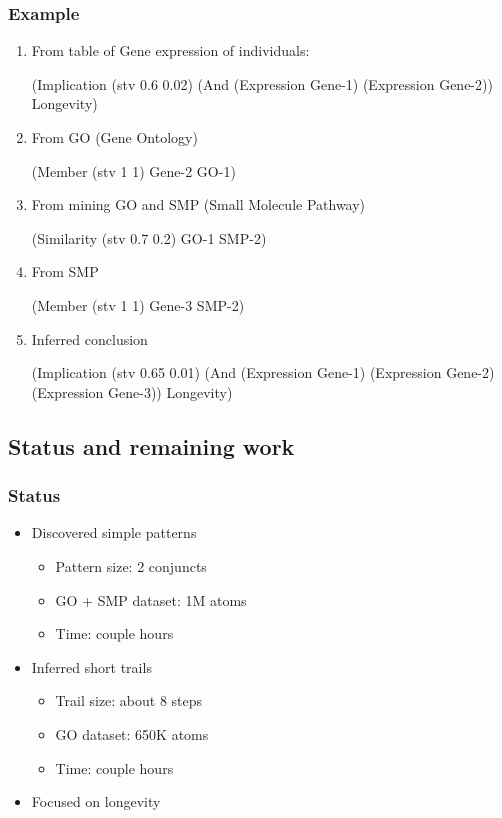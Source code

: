 \documentclass[aspectratio=169]{beamer}
\begin{document}
\begin{frame}[fragile]
  \frametitle{Example}

  \begin{enumerate}
  \item From table of Gene expression of individuals:
    {\tiny \begin{semiverbatim}
(Implication (stv 0.6 0.02)
  (And
    (Expression Gene-1)
    (Expression Gene-2))
  Longevity)
    \end{semiverbatim}}
  \item From GO (Gene Ontology)
    {\tiny \begin{semiverbatim}
(Member (stv 1 1) Gene-2 GO-1)
    \end{semiverbatim}}
  \item From mining GO and SMP (Small Molecule Pathway)
    {\tiny \begin{semiverbatim}
(Similarity (stv 0.7 0.2) GO-1 SMP-2)
    \end{semiverbatim}}
  \item From SMP
    {\tiny \begin{semiverbatim}
(Member (stv 1 1) Gene-3 SMP-2)
    \end{semiverbatim}}
  \item Inferred conclusion
    {\tiny \begin{semiverbatim}
(Implication (stv 0.65 0.01)
  (And
    (Expression Gene-1)
    (Expression Gene-2)
    (Expression Gene-3))
  Longevity)
    \end{semiverbatim}}
  \end{enumerate}
\end{frame}

\subsection{Status and remaining work}

\begin{frame}
  \frametitle{Status}

  \begin{itemize}
  \item Discovered simple patterns
    \begin{itemize}
    \item Pattern size: 2 conjuncts
    \item GO + SMP dataset: 1M atoms
    \item Time: couple hours
    \end{itemize}
  \item Inferred short trails
    \begin{itemize}
    \item Trail size: about 8 steps
    \item GO dataset: 650K atoms
    \item Time: couple hours
    \end{itemize}
  \item Focused on longevity
  \end{itemize}
\end{frame}
\end{document}

